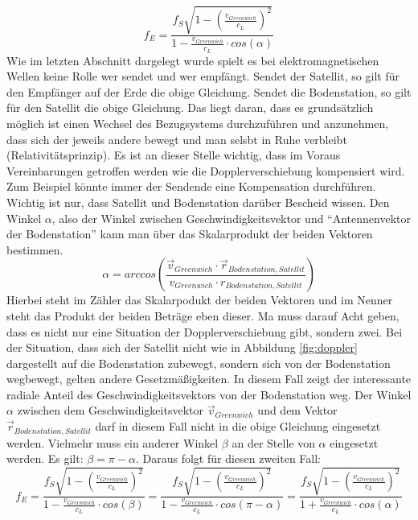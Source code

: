 \begin{equation}
f_E=\frac{f_S\sqrt{1-\left(\frac{v_{Greenwich}}{c_L}\right)^2}}{1-\frac{v_{Greenwich}}{c_L} \cdot cos(\alpha)}
\end{equation}     
Wie im letzten Abschnitt dargelegt wurde spielt es bei elektromagnetischen Wellen keine Rolle wer sendet und wer empfängt. Sendet der Satellit, so gilt für den Empfänger auf der Erde die obige Gleichung. Sendet die Bodenstation, so gilt für den Satellit die obige Gleichung. Das liegt daran, dass es grundsätzlich möglich ist einen Wechsel des Bezugsystems durchzuführen und anzunehmen, dass sich der jeweils andere bewegt und man selsbt in Ruhe verbleibt (Relativitätsprinzip). Es ist an dieser Stelle wichtig, dass im Voraus Vereinbarungen getroffen werden wie die Dopplerverschiebung kompensiert wird. Zum Beispiel könnte immer der Sendende eine Kompensation durchführen. Wichtig ist nur, dass Satellit und Bodenstation darüber Bescheid wissen. 
\newpar
Den Winkel \ensuremath{\alpha}, also der Winkel zwischen Geschwindigkeitsvektor und "`Antennenvektor der Bodenstation"' kann man über das Skalarprodukt der beiden Vektoren bestimmen.
\begin{equation}
	\alpha = arccos \left(\frac{\vec{v}_{Greenwich} \cdot \vec{r}_{Bodenstation,Satellit}}{v_{Greenwich} \cdot r_{Bodenstation,Satellit}}\right)
\end{equation}  
Hierbei steht im Zähler das Skalarpodukt der beiden Vektoren und im Nenner steht das Produkt der beiden Beträge eben dieser. 
\newpar
Ma muss darauf Acht geben, dass es nicht nur eine Situation der Dopplerverschiebung gibt, sondern zwei. Bei der Situation, dass sich der Satellit nicht wie in Abbildung \ref{fig:doppler} dargestellt auf die Bodenstation zubewegt, sondern sich von der Bodenstation wegbewegt, gelten andere Gesetzmäßigkeiten. In diesem Fall zeigt der interessante radiale Anteil des Geschwindigkeitsvektors von der Bodenstation weg. Der Winkel \ensuremath{\alpha} zwischen dem Geschwindigkeitsvektor \ensuremath{\vec{v}_{Greenwich}} und dem Vektor \ensuremath{\vec{r}_{Bodenstation,Satellit}} darf in diesem Fall nicht in die obige Gleichung eingesetzt werden. Vielmehr muss ein anderer Winkel \ensuremath{\beta} an der Stelle von \ensuremath{\alpha} eingesetzt werden. Es gilt: \ensuremath{\beta=\pi-\alpha}. Daraus folgt für diesen zweiten Fall:    
\begin{equation}
f_E=\frac{f_S\sqrt{1-\left(\frac{v_{Greenwich}}{c_L}\right)^2}}{1-\frac{v_{Greenwich}}{c_L} \cdot cos(\beta)}=\frac{f_S\sqrt{1-\left(\frac{v_{Greenwich}}{c_L}\right)^2}}{1-\frac{v_{Greenwich}}{c_L} \cdot cos(\pi-\alpha)}=\frac{f_S\sqrt{1-\left(\frac{v_{Greenwich}}{c_L}\right)^2}}{1+\frac{v_{Greenwich}}{c_L} \cdot cos(\alpha)}
\end{equation}     